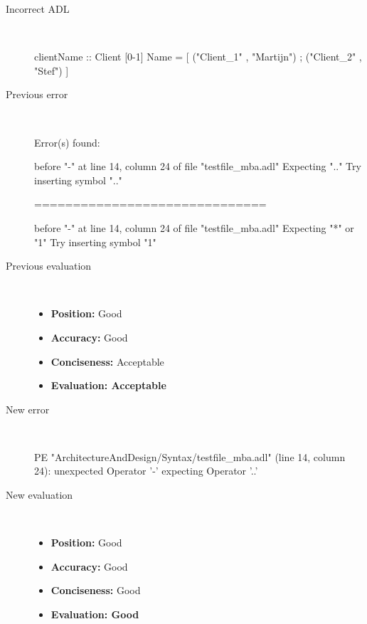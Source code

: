 \begin{description}
  \item[Incorrect ADL]~\\
\begin{adl}
clientName :: Client [0-1] Name =
    [ ("Client_1"      , "Martijn")
    ; ("Client_2"      , "Stef")
    ]\end{adl}
  \item[Previous error]~\\
\begin{haskell}
Error(s) found:

before "-" at line 14, column 24 of file "testfile_mba.adl"
Expecting ".."
Try inserting symbol ".."

==============================

before "-" at line 14, column 24 of file "testfile_mba.adl"
Expecting "*" or "1"
Try inserting symbol "1"\end{haskell}
  \item[Previous evaluation]~\\
    \begin{itemize}
    \item \textbf{Position:} Good
    \item \textbf{Accuracy:} Good
    \item \textbf{Conciseness:} Acceptable
    \item \textbf{Evaluation: Acceptable}
    \end{itemize}
  \item[New error]~\\
\begin{haskell}
PE "ArchitectureAndDesign/Syntax/testfile_mba.adl" (line 14, column 24):
unexpected Operator '-'
expecting Operator '..'\end{haskell}
  \item[New evaluation]~\\
    \begin{itemize}
    \item \textbf{Position:} Good
    \item \textbf{Accuracy:} Good
    \item \textbf{Conciseness:} Good
    \item \textbf{Evaluation: Good}
    \end{itemize}
  \end{description}

\hrulefill


